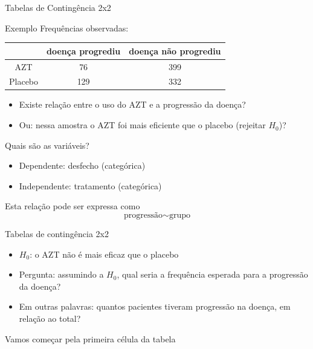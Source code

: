 \documentclass{beamer}
\begin{document}
\begin{frame}[label=exemplo8.1]{\scriptsize Tabelas de Contingência 2x2}
  \begin{exampleblock}{Exemplo}
    \footnotesize
    Frequências observadas:
    \begin{tabular}{c|c|c}
      & doença progrediu & doença não progrediu\\
      \hline
      AZT & 76 & 399 \\
      \hline
      Placebo & 129 & 332 \\
    \end{tabular}
  \end{exampleblock}
  \begin{itemize}
  \item Existe relação entre o uso do AZT e a progressão da doença?
  \item Ou: nessa amostra o AZT foi mais eficiente que o placebo
    (rejeitar $H_0$)?
  \end{itemize}
\end{frame}

\begin{frame}{\scriptsize Quais são as variáveis?}
  \begin{itemize}
    \small
  \item Dependente: desfecho (categórica)
  \item Independente: tratamento (categórica)
  \end{itemize}
  \vfill
  \begin{block}{Esta relação pode ser expressa como}
    \begin{displaymath}
      \text{progressão} \sim \text{grupo}
    \end{displaymath}
  \end{block}
\end{frame}

\begin{frame}{\scriptsize Tabelas de contingência 2x2}
  \begin{itemize}
  \item $H_0$: o AZT não é mais eficaz que o placebo
  \item Pergunta: assumindo a $H_0$, qual seria a frequência esperada
    para a progressão da doença?
  \item Em outras palavras: quantos pacientes tiveram progressão na
    doença, em relação ao total?
  \end{itemize}
\end{frame}

\begin{frame}
  \begin{center}
    Vamos começar pela primeira célula da tabela
  \end{center}
\end{frame}
\end{document}
